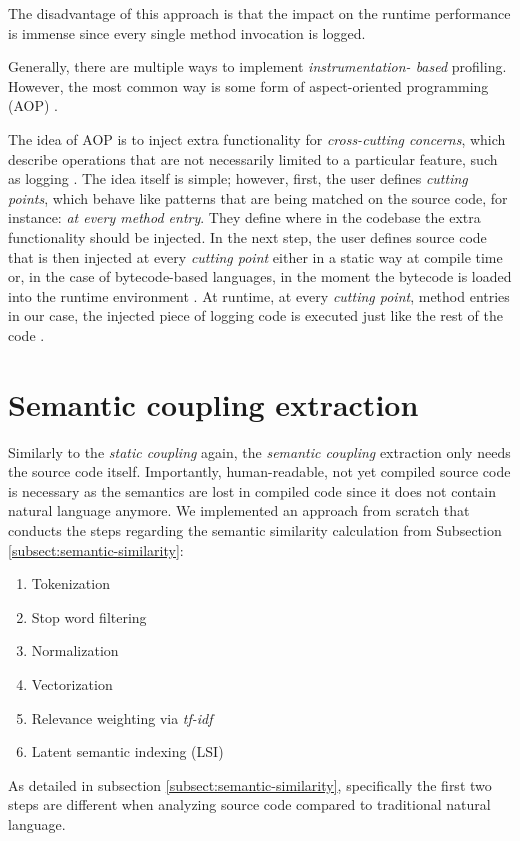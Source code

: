 \documentclass[12pt,a4paper]{report}
\begin{document}
The disadvantage of this approach is that the impact on the runtime performance
is immense since every single method invocation is logged.

Generally, there are multiple ways to implement \textit{instrumentation\hyp
based} profiling. However, the most common way is some form of aspect-oriented
programming (AOP) \cite{kiczales1997aop}.

The idea of AOP is to inject extra functionality for \textit{cross-cutting
concerns}, which describe operations that are not necessarily limited to a
particular feature, such as logging \cite{kiczales1997aop}. The idea itself is
simple; however, first, the user defines \textit{cutting points}, which behave
like patterns that are being matched on the source code, for instance:
\textit{at every method entry}. They define where in the codebase the extra
functionality should be injected. In the next step, the user defines source
code that is then injected at every \textit{cutting point} either in a static
way at compile time or, in the case of bytecode\hyp based languages, in the
moment the bytecode is loaded into the runtime environment \cite{
kiczales1997aop}. At runtime, at every \textit{cutting point}, method entries
in our case, the injected piece of logging code is executed just like the rest
of the code \cite{kiczales1997aop}.



\section{Semantic coupling extraction}

Similarly to the \textit{static coupling} again, the \textit{semantic coupling}
extraction only needs the source code itself. Importantly, human-readable, not
yet compiled source code is necessary as the semantics are lost in compiled
code since it does not contain natural language anymore. We implemented an
approach from scratch that conducts the steps regarding the semantic similarity
calculation from Subsection \ref{subsect:semantic-similarity}:
\begin{enumerate}[noitemsep]
  \item Tokenization
  \item Stop word filtering
  \item Normalization
  \item Vectorization
  \item Relevance weighting via \textit{tf-idf}
  \item Latent semantic indexing (LSI)
\end{enumerate}
As detailed in subsection
\ref{subsect:semantic-similarity}, specifically the first two steps are
different when analyzing source code compared to traditional natural language.
\end{document}
